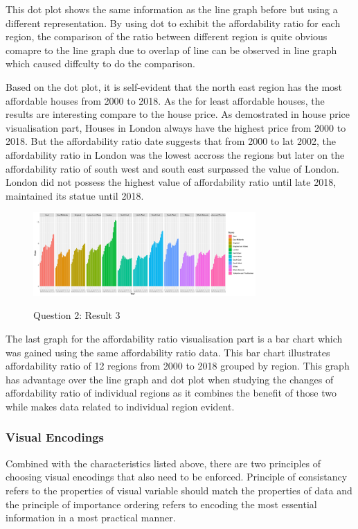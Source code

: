 \documentclass{article}
\begin{document}
This dot plot shows the same information as the line graph before but using a different representation. 
By using dot to exhibit the affordability ratio for each region, the comparison of the ratio between different 
region is quite obvious comapre to the line graph due to overlap of line can be observed in line graph 
which caused diffculty to do the comparison.

Based on the dot plot, it is self-evident that the north east region has the most affordable houses from 2000 
to 2018. As the for least affordable houses, the results are interesting compare to the house price. 
As demostrated in house price visualisation part, Houses in London always have the highest price from 2000 to 2018.
But the affordability ratio date suggests that from 2000 to lat 2002, the affordability ratio in London was the lowest 
accross the regions but later on the affordability ratio of south west and south east surpassed the value of London. 
London did not possess the highest value of affordability ratio until late 2018, maintained its statue until 2018.


\begin{figure}[H]
  \begin{minipage}[b]{1.0\linewidth}
    \centering
    \centerline{\includegraphics[width=8.5cm]{Q2Geom_gridbar}}
    \centerline{Question 2: Result 3}\medskip
  \end{minipage}
\end{figure}

The last graph for the affordability ratio visualisation part is a bar chart which was gained using the same 
affordability ratio data. This bar chart illustrates affordability ratio of 12 regions from 2000 to 2018 
grouped by region. This graph has advantage over the line graph and dot plot when studying the changes of affordability ratio of individual 
regions as it combines the benefit of those two while makes data related to individual region evident.

\subsubsection{Visual Encodings}
Combined with the characteristics listed above, there are two principles of choosing visual encodings that 
also need to be enforced. Principle of consistancy refers to the properties of visual variable should match 
the properties of data and the principle of importance ordering refers to encoding the most essential information 
in a most practical manner.
\end{document}
